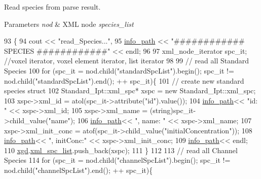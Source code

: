 Read species from parse result. 


\begin{DoxyParams}{Parameters}
{\em nod} & X\+M\+L node {\itshape species\+\_\+list} \\
\hline
\end{DoxyParams}

\begin{DoxyCode}
93                                                   \{
94     cout << \textcolor{stringliteral}{"read\_Species..."},
95     \hyperlink{classnw_1_1_standard___ipt_a7b8147e8b90f4adabb30e1b3fd8c40b8}{info\_path} << \textcolor{stringliteral}{"############ SPECIES ############"} << endl;
96 
97     xml\_node\_iterator spc\_it;  \textcolor{comment}{//voxel iterator, voxel element iterator, list iterator}
98 
99 \textcolor{comment}{//  read all Standard Species}
100     \textcolor{keywordflow}{for} (spc\_it = nod.child(\textcolor{stringliteral}{"standardSpcList"}).begin(); spc\_it != nod.child(\textcolor{stringliteral}{"standardSpcList"}).end(); ++
      spc\_it)\{
101 \textcolor{comment}{//      create new standard species struct}
102         Standard\_Ipt::xml\_spc* xspc = \textcolor{keyword}{new} Standard\_Ipt::xml\_spc;
103         xspc->xml\_id = atol(spc\_it->attribute(\textcolor{stringliteral}{"id"}).value());
104         \hyperlink{classnw_1_1_standard___ipt_a7b8147e8b90f4adabb30e1b3fd8c40b8}{info\_path}<< \textcolor{stringliteral}{"id: "} << xspc->xml\_id;
105         xspc->xml\_name = (string)spc\_it->child\_value(\textcolor{stringliteral}{"name"});
106         \hyperlink{classnw_1_1_standard___ipt_a7b8147e8b90f4adabb30e1b3fd8c40b8}{info\_path}<< \textcolor{stringliteral}{", name: "} << xspc->xml\_name;
107         xspc->xml\_init\_conc = atof(spc\_it->child\_value(\textcolor{stringliteral}{"initialConcentration"}));
108         \hyperlink{classnw_1_1_standard___ipt_a7b8147e8b90f4adabb30e1b3fd8c40b8}{info\_path}<< \textcolor{stringliteral}{", initConc:"} << xspc->xml\_init\_conc;
109         \hyperlink{classnw_1_1_standard___ipt_a7b8147e8b90f4adabb30e1b3fd8c40b8}{info\_path}<< endl;
110         \hyperlink{classnw_1_1_standard___ipt_aad5708d9729b7a5f660dade1927b4d4e}{xgd}.\hyperlink{structnw_1_1_standard___ipt_1_1xml__gen__data_a70786e61ea513972d7c50982e101726c}{xml\_spc\_list}.push\_back(xspc);
111     \}
112 
113 \textcolor{comment}{//  read all Channel Species}
114     \textcolor{keywordflow}{for} (spc\_it = nod.child(\textcolor{stringliteral}{"channelSpcList"}).begin(); spc\_it != nod.child(\textcolor{stringliteral}{"channelSpcList"}).end(); ++
      spc\_it)\{

\end{DoxyCode}
